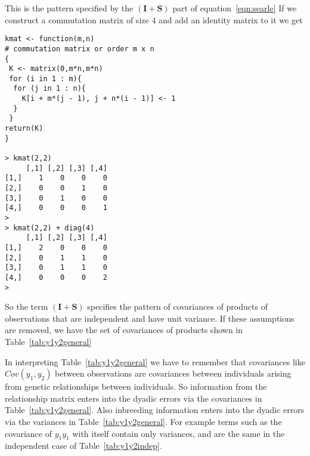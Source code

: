 \documentclass[titlepage,a4paper,12pt]{article}  %
\begin{document}
This is the pattern specified by the $(\bm{I} + \bm{S})$ part of equation~\ref{eqn:searle} If we construct a commutation matrix of size $4$ and add an identity matrix to it we get
\begin{verbatim}
kmat <- function(m,n)
# commutation matrix or order m x n
{
 K <- matrix(0,m*n,m*n)
 for (i in 1 : m){
  for (j in 1 : n){
    K[i + m*(j - 1), j + n*(i - 1)] <- 1
  }
 }
return(K)
}

> kmat(2,2)
     [,1] [,2] [,3] [,4]
[1,]    1    0    0    0
[2,]    0    0    1    0
[3,]    0    1    0    0
[4,]    0    0    0    1
> 
> kmat(2,2) + diag(4)
     [,1] [,2] [,3] [,4]
[1,]    2    0    0    0
[2,]    0    1    1    0
[3,]    0    1    1    0
[4,]    0    0    0    2
> 
\end{verbatim}

So the term $(\bm{I} + \bm{S})$ specifies the pattern of covariances of products of observations that are independent and have unit variance. If these assumptions are removed, we have the set of covariances of products shown in Table~\ref{tab:y1y2general}

In interpreting Table~\ref{tab:y1y2general} we have to remember that covariances  like $Cov(y_{1},y_{2})$ between observations are covariances between individuals arising from genetic relationships between individuals. So information from the relationship matrix enters into the dyadic errors via the covariances in Table~\ref{tab:y1y2general}. Also inbreeding information enters into the dyadic errors via the variances in Table~\ref{tab:y1y2general}. For example terms such as the covariance of $y_{1}y_{1}$ with itself contain only variances, and are the same in the independent case of Table~\ref{tab:y1y2indep}.
\end{document}
